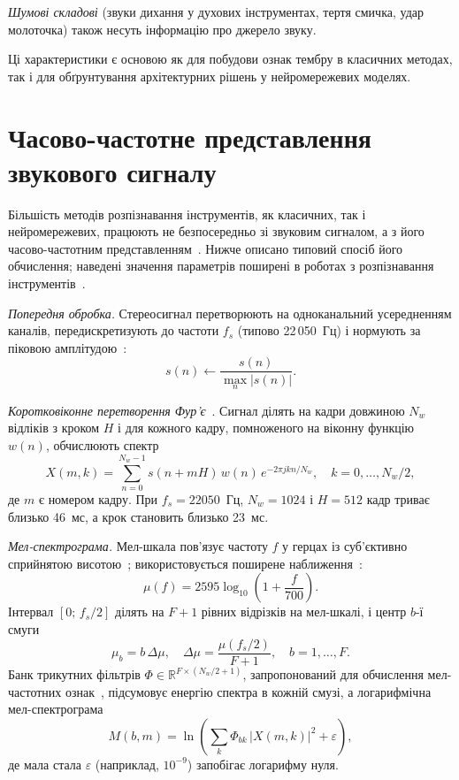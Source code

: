 \textit{Шумові складові} (звуки дихання у духових інструментах, тертя
смичка, удар молоточка) також несуть інформацію про джерело звуку.

Ці характеристики є основою як для побудови ознак тембру в
класичних методах, так і для обґрунтування архітектурних рішень у
нейромережевих моделях.

\section{Часово-частотне представлення звукового сигналу}
\label{sec:tfgen}

Більшість методів розпізнавання інструментів, як класичних, так і
нейромережевих, працюють не безпосередньо зі звуковим сигналом, а з його
часово-частотним представленням~\cite{muller2015,choi2017}. Нижче
описано типовий спосіб його обчислення; наведені значення параметрів
поширені в роботах з розпізнавання інструментів~\cite{han2017}.

\textit{Попередня обробка.} Стереосигнал перетворюють на одноканальний
усередненням каналів, передискретизують до частоти $f_s$ (типово
22\,050~Гц) і нормують за піковою амплітудою~\cite{han2017}:
\begin{equation}
    s(n) \leftarrow \frac{s(n)}{\max_n |s(n)|}.
\end{equation}

\textit{Коротковіконне перетворення Фур'є}~\cite{oppenheim2010,muller2015}.
Сигнал ділять на кадри довжиною $N_w$ відліків з кроком $H$ і для кожного
кадру, помноженого на віконну функцію $w(n)$, обчислюють спектр
\begin{equation}
    X(m, k) = \sum_{n=0}^{N_w-1} s(n + mH)\, w(n)\, e^{-2\pi j k n / N_w},
    \quad k = 0, \ldots, N_w/2,
\end{equation}
де $m$ є номером кадру. При $f_s = 22050$~Гц, $N_w = 1024$ і $H = 512$
кадр триває близько 46~мс, а крок становить близько 23~мс.

\textit{Мел-спектрограма.} Мел-шкала пов'язує частоту $f$ у герцах із
суб'єктивно сприйнятою висотою~\cite{stevens1937}; використовується
поширене наближення~\cite{oshaughnessy1987}:
\begin{equation}
    \mu(f) = 2595 \log_{10}\!\left(1 + \frac{f}{700}\right).
    \label{eq:mel}
\end{equation}
Інтервал $[0;\, f_s/2]$ ділять на $F + 1$ рівних відрізків на мел-шкалі,
і центр $b$-ї смуги
\begin{equation}
    \mu_b = b\, \Delta\mu, \quad \Delta\mu = \frac{\mu(f_s/2)}{F+1},
    \quad b = 1, \ldots, F.
    \label{eq:melcentres}
\end{equation}
Банк трикутних фільтрів $\Phi \in \mathbb{R}^{F \times (N_w/2+1)}$,
запропонований для обчислення мел-частотних ознак~\cite{davis1980},
підсумовує енергію спектра в кожній смузі, а логарифмічна мел-спектрограма
\begin{equation}
    M(b, m) = \ln\!\left( \sum_k \Phi_{bk}\, |X(m,k)|^2 + \varepsilon \right),
    \label{eq:logmel}
\end{equation}
де мала стала $\varepsilon$ (наприклад, $10^{-9}$) запобігає логарифму
нуля.

